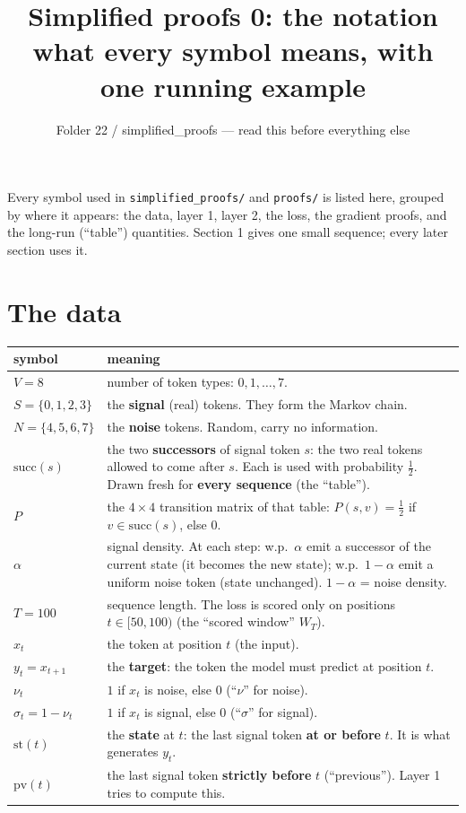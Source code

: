 \documentclass[11pt]{article}
\title{Simplified proofs 0: the notation\\[4pt]\large what every symbol means, with one running example}
\author{Folder 22 / simplified\_proofs --- read this before everything else}
\date{}
\newcommand{\1}{\mathbf{1}}
\begin{document}
\maketitle

\begin{idea}
Every symbol used in \texttt{simplified\_proofs/} and \texttt{proofs/} is listed here, grouped by where it
appears: the data, layer 1, layer 2, the loss, the gradient proofs, and the long-run (``table'') quantities.
Section 1 gives one small sequence; every later section uses it.
\end{idea}

\section{The data}

\begin{center}
\begin{tabular}{>{\raggedright}p{2.6cm}p{11.8cm}}
\toprule
symbol & meaning \\\midrule
$V=8$ & number of token types: $0,1,\dots,7$.\\
$S=\{0,1,2,3\}$ & the \textbf{signal} (real) tokens. They form the Markov chain.\\
$N=\{4,5,6,7\}$ & the \textbf{noise} tokens. Random, carry no information.\\
$\mathrm{succ}(s)$ & the two \textbf{successors} of signal token $s$: the two real tokens allowed to come after $s$. Each is used with probability $\tfrac12$. Drawn fresh for \textbf{every sequence} (the ``table'').\\
$P$ & the $4\times4$ transition matrix of that table: $P(s,v)=\tfrac12$ if $v\in\mathrm{succ}(s)$, else $0$.\\
$\alpha$ & signal density. At each step: w.p.\ $\alpha$ emit a successor of the current state (it becomes the new state); w.p.\ $1-\alpha$ emit a uniform noise token (state unchanged). $1-\alpha$ = noise density.\\
$T=100$ & sequence length. The loss is scored only on positions $t\in[50,100)$ (the ``scored window'' $W_T$).\\
$x_t$ & the token at position $t$ (the input).\\
$y_t=x_{t+1}$ & the \textbf{target}: the token the model must predict at position $t$.\\
$\nu_t$ & $1$ if $x_t$ is noise, else $0$ (``$\nu$'' for noise).\\
$\sigma_t=1-\nu_t$ & $1$ if $x_t$ is signal, else $0$ (``$\sigma$'' for signal).\\
$\mathrm{st}(t)$ & the \textbf{state} at $t$: the last signal token \textbf{at or before} $t$. It is what generates $y_t$.\\
$\mathrm{pv}(t)$ & the last signal token \textbf{strictly before} $t$ (``previous''). Layer 1 tries to compute this.\\
\bottomrule
\end{tabular}
\end{center}
\end{document}
